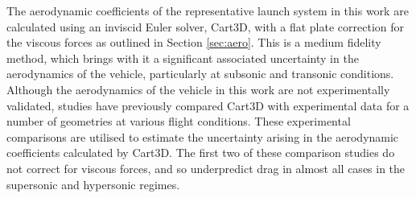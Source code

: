 The aerodynamic coefficients of the representative launch system in this work are calculated using an inviscid Euler solver, Cart3D, with a flat plate correction for the viscous forces as outlined in Section \ref{sec:aero}. This is a medium fidelity method, which brings with it a significant associated uncertainty in the aerodynamics of the vehicle, particularly at subsonic and transonic conditions. Although the aerodynamics of the vehicle in this work are not experimentally validated, studies have previously compared Cart3D with experimental data for a number of geometries at various flight conditions. These experimental comparisons are utilised to estimate the uncertainty arising in the aerodynamic coefficients calculated by Cart3D. The first two of these comparison studies do not correct for viscous forces, and so underpredict drag in almost all cases in the supersonic and hypersonic regimes.




